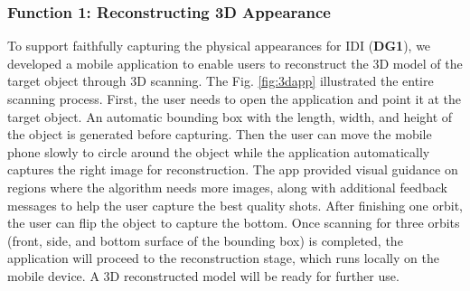 
\subsubsection{Function 1: Reconstructing 3D Appearance}
\label{sec: Reconstruct the 3D model by 3D scanning}
To support faithfully capturing the physical appearances for IDI (\textbf{DG1}), we developed a mobile application to enable users to reconstruct the 3D model of the target object through 3D scanning.
The Fig. \ref{fig:3dapp} illustrated the entire scanning process. 
First, the user needs to open the application and point it at the target object. 
An automatic bounding box with the length, width, and height of the object is generated before capturing. 
Then the user can move the mobile phone slowly to circle around the object while the application automatically captures the right image for reconstruction. 
The app provided visual guidance on regions where the algorithm needs more images, along with additional feedback messages to help the user capture the best quality shots. 
After finishing one orbit, the user can flip the object to capture the bottom. 
Once scanning for three orbits (front, side, and bottom surface of the bounding box) is completed, the application will proceed to the reconstruction stage, which runs locally on the mobile device. 
A 3D reconstructed model will be ready for further use. 

